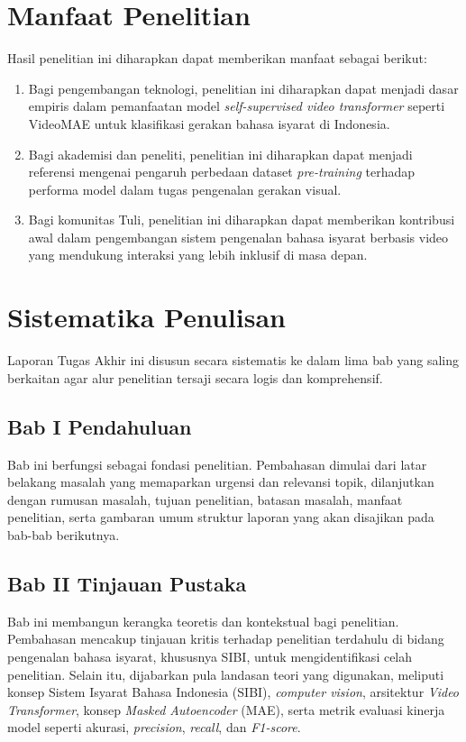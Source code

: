 \section{Manfaat Penelitian} \label{I.Manfaat}
Hasil penelitian ini diharapkan dapat memberikan manfaat sebagai berikut:

\begin{enumerate}
    \item Bagi pengembangan teknologi, penelitian ini diharapkan dapat menjadi dasar empiris dalam pemanfaatan model \textit{self-supervised video transformer} seperti VideoMAE untuk klasifikasi gerakan bahasa isyarat di Indonesia.
    \item Bagi akademisi dan peneliti, penelitian ini diharapkan dapat menjadi referensi mengenai pengaruh perbedaan dataset \textit{pre-training} terhadap performa model dalam tugas pengenalan gerakan visual.
    \item Bagi komunitas Tuli, penelitian ini diharapkan dapat memberikan kontribusi awal dalam pengembangan sistem pengenalan bahasa isyarat berbasis video yang mendukung interaksi yang lebih inklusif di masa depan.
\end{enumerate}

\section{Sistematika Penulisan} \label{I.Sistematika}
Laporan Tugas Akhir ini disusun secara sistematis ke dalam lima bab yang saling berkaitan agar alur penelitian tersaji secara logis dan komprehensif.\par

\subsection{Bab I Pendahuluan}
Bab ini berfungsi sebagai fondasi penelitian. Pembahasan dimulai dari latar belakang masalah yang memaparkan urgensi dan relevansi topik, dilanjutkan dengan rumusan masalah, tujuan penelitian, batasan masalah, manfaat penelitian, serta gambaran umum struktur laporan yang akan disajikan pada bab-bab berikutnya.\par

\subsection{Bab II Tinjauan Pustaka}
Bab ini membangun kerangka teoretis dan kontekstual bagi penelitian. Pembahasan mencakup tinjauan kritis terhadap penelitian terdahulu di bidang pengenalan bahasa isyarat, khususnya SIBI, untuk mengidentifikasi celah penelitian. Selain itu, dijabarkan pula landasan teori yang digunakan, meliputi konsep Sistem Isyarat Bahasa Indonesia (SIBI), \textit{computer vision}, arsitektur \textit{Video Transformer}, konsep \textit{Masked Autoencoder} (MAE), serta metrik evaluasi kinerja model seperti akurasi, \textit{precision}, \textit{recall}, dan \textit{F1-score}.\par

